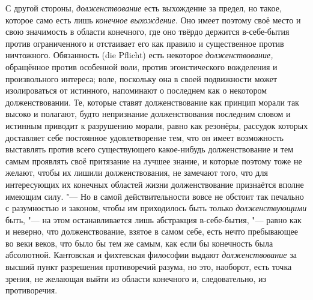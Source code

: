 С другой стороны, {\em долженствование} есть выхождение
за предел, но такое, которое само есть лишь
{\em конечное выхождение}. Оно имеет поэтому своё место
и свою значимость в области конечного, где оно твёрдо держится в-себе-бытия
против ограниченного и отстаивает его как правило и существенное против
ничтожного. Обязанность (die Pflicht) есть некоторое
{\em долженствование,} обращённое против особенной
воли, против эгоистического вожделения и произвольного интереса; воле,
поскольку она в своей подвижности может изолироваться от истинного,
напоминают о последнем как о некотором долженствовании. Те, которые ставят
долженствование как принцип морали так высоко и полагают, будто непризнание
долженствования последним словом и истинным приводит к разрушению морали,
равно как резонёры, рассудок которых доставляет себе постоянное
удовлетворение тем, что он имеет возможность выставлять против всего
существующего какое-нибудь долженствование и тем самым проявлять своё
притязание на лучшее знание, и которые поэтому тоже не желают, чтобы их лишили
долженствования, не замечают того, что для интересующих их конечных
областей жизни долженствование признаётся вполне имеющим силу. "--- Но в самой
действительности вовсе не обстоит так печально с разумностью и законом,
чтобы им приходилось быть только {\em долженствующими}
быть, "--- на этом останавливается лишь абстракция в-себе-бытия, "--- равно как и
неверно, что долженствование, взятое в самом себе, есть нечто пребывающее
во веки веков, что было бы тем же самым, как если бы конечность была
абсолютной. Кантовская и фихтевская философии выдают
{\em долженствование} за высший пункт разрешения
противоречий разума, но это, наоборот, есть точка зрения, не желающая выйти
из области конечного и, следовательно, из противоречия.


